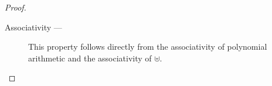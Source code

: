 \begin{proposition}
\begin{proof}
\begin{description}

    \item[Associativity --- ]

      This property follows directly from the associativity of
      polynomial arithmetic and the associativity of $\uplus$.





\end{description}
\end{proof}
\end{proposition}
